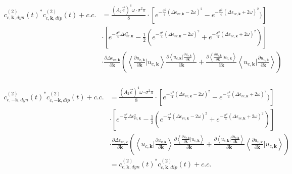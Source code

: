 \begin{equation}
\begin{aligned}
    c^{(2)}_{c,\mathbf k,dyn}(t)^* c^{(2)}_{c,\mathbf k,dip}(t)+c.c. &=\frac{(A_2 \vec e)^4 \omega  \cdot \sigma^2 \pi}{8}  \cdot [e^{-\frac{\sigma^2}{4} (\Delta \epsilon_{vc,\mathbf k}-2\omega )^2}-e^{-\frac{\sigma^2}{4} (\Delta \epsilon_{vc,\mathbf k}+2\omega )^2})]\\
    &\cdot [e^{-\frac{\sigma^2}{4} \Delta \epsilon_{vc,\mathbf k} ^2}-\frac{1}{2}(e^{-\frac{\sigma^2}{4} (\Delta \epsilon_{vc,\mathbf k}-2\omega )^2}+e^{-\frac{\sigma^2}{4} (\Delta \epsilon_{vc,\mathbf k}+2\omega )^2})]\\
   & \cdot \frac{\partial  \Delta \epsilon_{vc,\mathbf k}}{\partial \mathbf k} 
   (\left \langle \frac{\partial u_{v,\mathbf k}}{\partial \mathbf k} |  u_{c,\mathbf k} \right \rangle \frac{\partial{\left \langle u_{c,\mathbf k}\Big |\frac{\partial u_{v,\mathbf k}}{\partial \mathbf k} \right \rangle}}{\partial {\mathbf k}}+
   \frac{\partial{\left \langle \frac{\partial u_{v,\mathbf k}}{\partial \mathbf k} \Big |u_{c,\mathbf k} \right \rangle}}{\partial {\mathbf k}} 
    \left \langle  u_{c,\mathbf k}| \frac{\partial u_{v,\mathbf k}}{\partial \mathbf k} \right \rangle )\\
\end{aligned}
\end{equation}

\begin{equation}
\begin{aligned}
    c^{(2)}_{c,-\mathbf k,dyn}(t)^* c^{(2)}_{c,-\mathbf k,dip}(t)+c.c. &=\frac{(A_2 \vec e)^4 \omega  \cdot \sigma^2 \pi}{8}  \cdot [e^{-\frac{\sigma^2}{4} (\Delta \epsilon_{vc,\mathbf k}-2\omega )^2}-e^{-\frac{\sigma^2}{4} (\Delta \epsilon_{vc,\mathbf k}+2\omega )^2})]\\
    &\cdot [e^{-\frac{\sigma^2}{4} \Delta \epsilon_{vc,\mathbf k} ^2}-\frac{1}{2}(e^{-\frac{\sigma^2}{4} (\Delta \epsilon_{vc,\mathbf k}-2\omega )^2}+e^{-\frac{\sigma^2}{4} (\Delta \epsilon_{vc,\mathbf k}+2\omega )^2})]\\
   & \cdot \frac{\partial  \Delta \epsilon_{vc,\mathbf k}}{\partial \mathbf k} 
   (\left \langle u_{c,\mathbf k} \big | \frac{\partial u_{v,\mathbf k}}{\partial \mathbf k}  \right \rangle \frac{\partial{\left \langle\frac{\partial u_{v,\mathbf k}}{\partial \mathbf k}\Big |u_{c,\mathbf k}\right \rangle}}{\partial {\mathbf k}} +
   \frac{\partial{\left \langle u_{c,\mathbf k}\Big |\frac{\partial u_{v,\mathbf k}}{\partial \mathbf k} \right \rangle}}{\partial {\mathbf k}}
    \left \langle \frac{\partial u_{v,\mathbf k}}{\partial \mathbf k} |  u_{c,\mathbf k} \right \rangle)\\
   &=c^{(2)}_{c,\mathbf k,dyn}(t)^* c^{(2)}_{c,\mathbf k,dip}(t)+c.c.
\end{aligned}
\end{equation}

